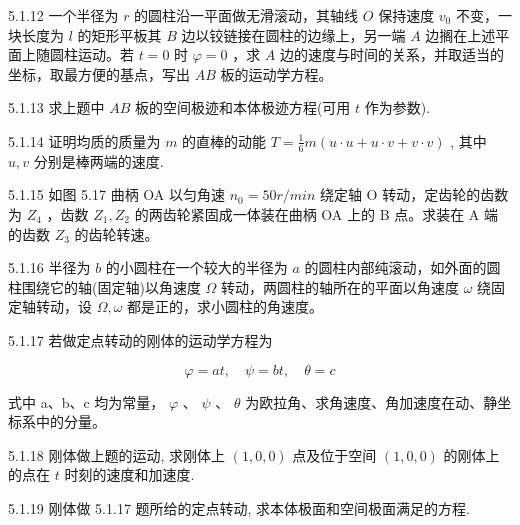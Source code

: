 \begin{problem}{5.1.12}
一个半径为 $r$ 的圆柱沿一平面做无滑滚动，其轴线 $O$ 保持速度 $v_{0}$ 不变，一块长度为 $l$ 的矩形平板其 $B$ 边以铰链接在圆柱的边缘上，另一端 $A$ 边搁在上述平面上随圆柱运动。若 $t = 0$ 时 $\varphi = 0$ ，求 $A$ 边的速度与时间的关系，并取适当的坐标，取最方便的基点，写出 $AB$ 板的运动学方程。
\end{problem}
\clearpage


\begin{problem}{5.1.13}
求上题中 $AB$ 板的空间极迹和本体极迹方程(可用 $t$ 作为参数).
\end{problem}
\clearpage


\begin{problem}{5.1.14}
证明均质的质量为 $m$ 的直棒的动能 $T = \frac{1}{6} m(u \cdot u + u \cdot v + v \cdot v)$ , 其中 $u, v$ 分别是棒两端的速度.
\end{problem}
\clearpage


\begin{problem}{5.1.15}
如图 5.17 曲柄 OA 以匀角速 $n_{0}=50r/min$ 绕定轴 O 转动，定齿轮的齿数为 $Z_{4}$ ，齿数 $Z_{1}, Z_{2}$ 的两齿轮紧固成一体装在曲柄 OA 上的 B 点。求装在 A 端的齿数 $Z_{3}$ 的齿轮转速。
\begin{center}

\end{center}
\end{problem}
\clearpage


\begin{problem}{5.1.16}
半径为 $b$ 的小圆柱在一个较大的半径为 $a$ 的圆柱内部纯滚动，如外面的圆柱围绕它的轴(固定轴)以角速度 $\Omega$ 转动，两圆柱的轴所在的平面以角速度 $\omega$ 绕固定轴转动，设 $\Omega, \omega$ 都是正的，求小圆柱的角速度。
\end{problem}
\clearpage


\begin{problem}{5.1.17}
若做定点转动的刚体的运动学方程为

\[
\varphi = a t, \quad \psi = b t, \quad \theta = c
\]

式中 a、b、c 均为常量， $\varphi$ 、 $\psi$ 、 $\theta$ 为欧拉角、求角速度、角加速度在动、静坐标系中的分量。
\end{problem}
\clearpage


\begin{problem}{5.1.18}
刚体做上题的运动, 求刚体上 $(1,0,0)$ 点及位于空间 $(1,0,0)$ 的刚体上的点在 $t$ 时刻的速度和加速度.
\end{problem}
\clearpage


\begin{problem}{5.1.19}
刚体做 5.1.17 题所给的定点转动, 求本体极面和空间极面满足的方程.
\end{problem}
\clearpage


